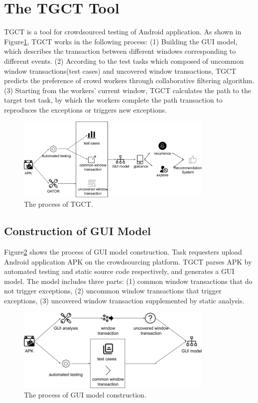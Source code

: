 \section{The TGCT Tool}
TGCT is a tool for crowdsourced testing of Android application. As shown in Figure\ref{fig:arch}, TGCT works in the following process: (1) Building the GUI model, which describes the transaction between different windows corresponding to different events. (2) According to the test tasks which composed of uncommon window transactions(test cases) and uncovered window transactions, TGCT predicts the preference of crowd workers through collaborative filtering algorithm. (3) Starting from the workers' current window, TGCT calculates the path to the target test task, by which the workers complete the path transaction to reproduces the exceptions or triggers new exceptions.
\begin{figure}[htbp]
\centering
\centerline{\includegraphics[width=\columnwidth,height=4cm]{fig/2.png}}
\caption{The process of TGCT.}
\label{fig:arch}
\end{figure}

\subsection{Construction of GUI Model}
Figure\ref{fig:flow_chart} shows the process of GUI model construction. Task requesters upload Android application APK on the crowdsourcing platform. TGCT parses APK by automated testing and static source code respectively, and generates a GUI model. The model includes three parts:
(1) common window transactions that do not trigger exceptions, (2) uncommon window transactions that trigger exceptions, (3) uncovered window transaction supplemented by static analysis.
\begin{figure}[htbp]
\centering
\centerline{\includegraphics[width=\columnwidth,height=4cm]{fig/3.png}}
\caption{The process of GUI model construction.}
\label{fig:flow_chart}
\end{figure}

